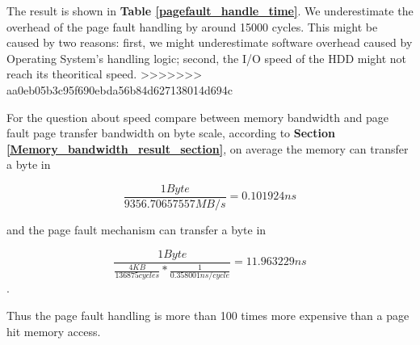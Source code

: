 The result is shown in \textbf{Table \ref{pagefault_handle_time}}. We underestimate the overhead of the page fault handling by around 15000 cycles. This might be caused by two reasons: first, we might underestimate software overhead caused by Operating System's handling logic; second, the I/O speed of the HDD might not reach its theoritical speed.
>>>>>>> aa0eb05b3c95f690ebda56b84d627138014d694c

For the question about speed compare between memory bandwidth and page fault page transfer bandwidth on byte scale, according to \textbf{Section \ref{Memory_bandwidth_result_section}}, on average the memory can transfer a byte in

$$\frac{1 Byte}{9356.70657557 MB/s} = 0.101924 ns $$

and the page fault mechanism can transfer a byte in

$$\frac{1 Byte}{\frac{4 KB}{136875 cycles} * \frac{1}{0.358001 ns/cycle}} = 11.963229 ns $$.

Thus the page fault handling is more than 100 times more expensive than a page hit memory access.
